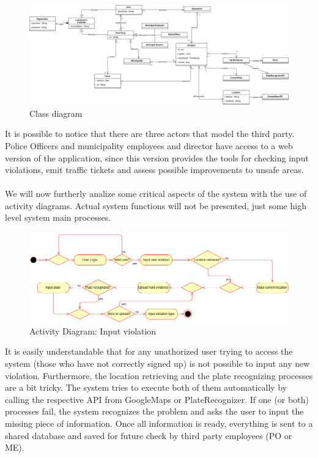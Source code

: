 \documentclass{article}
\begin{document}
\begin{figure}[H]
    \centering
    \includegraphics[scale=0.38,angle=90]{Images/umlmodel}
    \caption{Class diagram}
\end{figure}

It is possible to notice that there are three actors that model the third party.
Police Officers and municipality employees and director have access to a web
version of the application, since this version provides the tools for checking
input violations, emit traffic tickets and assess possible improvements to
unsafe areas.\\
\\
We will now furtherly analize some critical aspects of the system with the use
of activity diagrams. Actual system functions will not be presented, just some
high level system main processes.

\begin{figure}[H]
    \centering
    \includegraphics[scale=0.36]{Images/ActivityInputViolation}
    \caption{Activity Diagram: Input violation}
\end{figure}

It is easily understandable that for any unathorized user trying to access the
system (those who have not correctly signed up) is not possible to input any new
violation. Furthermore, the location retrieving and the plate recognizing
processes are a bit tricky. The system tries to execute both of them
automatically by calling the respective API from GoogleMaps or PlateRecognizer.
If one (or both) processes fail, the system recognizes the problem and asks the
user to input the missing piece of information. Once all information is ready,
everything is sent to a shared database and saved for future check by third
party employees (PO or ME). 
\end{document}
